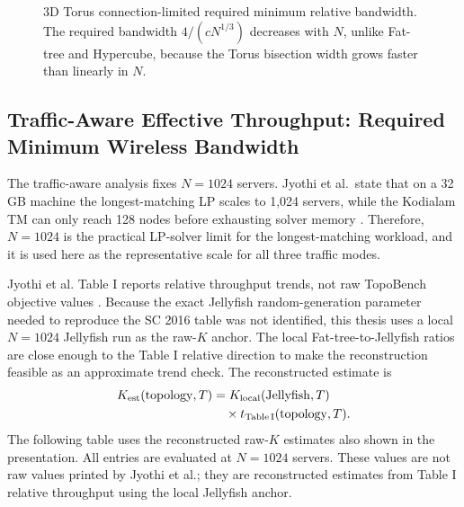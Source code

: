 \documentclass[conference]{IEEEtran}
\begin{document}
\begin{figure}[!t]
\centering
{}
\caption{3D Torus connection-limited required minimum relative bandwidth. The required bandwidth $4/(cN^{1/3})$ decreases with $N$, unlike Fat-tree and Hypercube, because the Torus bisection width grows faster than linearly in $N$.}
\label{fig:torus-cl}
\end{figure}

\subsection{Traffic-Aware Effective Throughput: Required Minimum Wireless Bandwidth}

The traffic-aware analysis fixes \(N=1024\) servers. Jyothi et al.\ state that on a 32\,GB machine the longest-matching LP scales to 1,024 servers, while the Kodialam TM can only reach 128 nodes before exhausting solver memory \cite{jyothi2016}. Therefore, \(N=1024\) is the practical LP-solver limit for the longest-matching workload, and it is used here as the representative scale for all three traffic modes.

Jyothi et al. Table I reports relative throughput trends, not raw TopoBench objective values \cite{jyothi2016}. Because the exact Jellyfish random-generation parameter needed to reproduce the SC 2016 table was not identified, this thesis uses a local \(N=1024\) Jellyfish run as the raw-\(K\) anchor. The local Fat-tree-to-Jellyfish ratios are close enough to the Table I relative direction to make the reconstruction feasible as an approximate trend check. The reconstructed estimate is
\begin{align}
K_{\mathrm{est}}(\mathrm{topology},T)
&=
K_{\mathrm{local}}(\mathrm{Jellyfish},T)
\notag\\
&\quad\times
t_{\mathrm{Table\,I}}(\mathrm{topology},T).
\end{align}
The following table uses the reconstructed raw-\(K\) estimates also shown in the presentation. All entries are evaluated at \(N=1024\) servers. These values are not raw values printed by Jyothi et al.; they are reconstructed estimates from Table I relative throughput using the local Jellyfish anchor.
\end{document}
